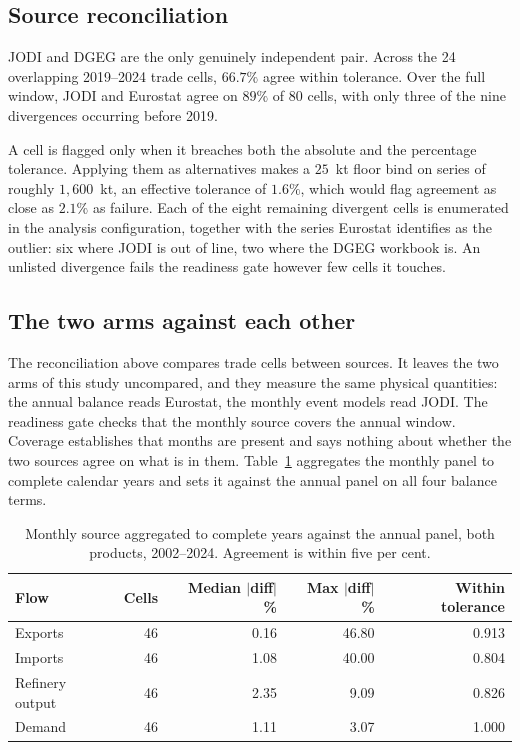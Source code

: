 \documentclass[11pt,a4paper]{article}
\begin{document}
\subsection{Source reconciliation}
\label{sec:recon}

JODI and DGEG are the only genuinely independent pair. Across the 24 overlapping 2019--2024 trade
cells, $66.7\%$ agree within tolerance. Over the
full window, JODI and Eurostat agree on $89\%$ of 80 cells, with only three of the nine
divergences occurring before 2019.

A cell is flagged only when it breaches both the absolute and the percentage tolerance. Applying
them as alternatives makes a $25$~kt floor bind on series of roughly $1{,}600$~kt, an effective
tolerance of $1.6\%$, which would flag agreement as close as $2.1\%$ as failure. Each of the
eight remaining divergent cells is enumerated in the analysis configuration, together
with the series Eurostat identifies as the outlier: six where JODI is out of line, two where the DGEG
workbook is. An unlisted divergence fails the readiness gate however few cells it touches.

\subsection{The two arms against each other}
\label{sec:armrecon}

The reconciliation above compares trade cells between sources. It leaves the two arms of this
study uncompared, and they measure the same physical quantities: the annual balance reads
Eurostat, the monthly event models read JODI. The readiness gate checks that the monthly source
covers the annual window. Coverage establishes that months are present and says nothing about
whether the two sources agree on what is in them. Table~\ref{tab:armrecon} aggregates the
monthly panel to complete calendar years and sets it against the annual panel on all four
balance terms.

\begin{table}[htbp]
\centering
\caption{Monthly source aggregated to complete years against the annual panel, both products,
2002--2024. Agreement is within five per cent.}
\label{tab:armrecon}
\begin{tabular}{lrrrr}
\toprule
Flow & Cells & Median $|$diff$|$ \% & Max $|$diff$|$ \% & Within tolerance \\
\midrule
Exports & 46 & 0.16 & 46.80 & 0.913 \\
Imports & 46 & 1.08 & 40.00 & 0.804 \\
Refinery output & 46 & 2.35 & 9.09 & 0.826 \\
Demand & 46 & 1.11 & 3.07 & 1.000 \\
\bottomrule
\end{tabular}
\end{table}
\end{document}
